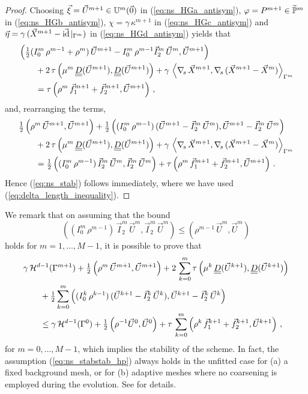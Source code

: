 \begin{proof}
Choosing $\vec\xi = \vec U^{m+1} \in \uspacedisc{0}{m}$ in
(\ref{eq:ns_HGa_antisym}), $\varphi = P^{m+1} \in \pnormspace^m$ in
(\ref{eq:ns_HGb_antisym}), $\chi = \gamma\,\kappa^{m+1}$ in
(\ref{eq:ns_HGc_antisym}) and
$\vec\eta=\gamma\,({\vec X^{m+1}-\vec\id\!\mid_{\Gamma^m}})$ in
(\ref{eq:ns_HGd_antisym}) yields that
\begin{align*}
& \left(\tfrac{1}{2}(I^m_0\,\rho^{m-1}+\rho^m)\,\vec U^{m+1} -
I^m_0\,\rho^{m-1} \vec I^m_2\,\vec U^m, \vec U^{m+1} \right) \\
& \qquad + 2\,\tau\left(\mu^m\,\mat D(\vec U^{m+1}), \mat D(\vec U^{m+1})\right)
+ \gamma\,\left\langle \nabs\,\vec X^{m+1}, \nabs\,(\vec X^{m+1} - \vec X^m)
\right\rangle_{\Gamma^m} \\
& \qquad = \tau\left(\rho^m\,\vec f_1^{m+1}+\vec f_2^{m+1}, \vec U^{m+1}
\right)\,,
\end{align*}
and, rearranging the terms,
\begin{align*}
& \tfrac{1}{2}\left(\rho^m\,\vec U^{m+1}, \vec U^{m+1} \right)+
\tfrac{1}{2}\left((I^m_0\,\rho^{m-1})\,(\vec U^{m+1}
-\vec I^m_2\,\vec U^m), \vec U^{m+1} - \vec I^m_2\,\vec U^m \right) \\
& \qquad + 2\,\tau\left(\mu^m\,\mat D(\vec U^{m+1}), \mat D(\vec U^{m+1})\right)
+ \gamma\,\left\langle \nabs\,\vec X^{m+1}, \nabs\,(\vec X^{m+1} - \vec X^m)
\right\rangle_{\Gamma^m} \\
& \qquad = \tfrac{1}{2}\left((I^m_0\,\rho^{m-1})\,\vec I^m_2\,\vec U^m,
\vec I^m_2\,\vec U^m \right)
+ \tau\left(\rho^m\,\vec f_1^{m+1}+\vec f_2^{m+1}, \vec U^{m+1} \right)\,.
\end{align*}
Hence (\ref{eq:ns_stab}) follows immediately, where we have used
(\ref{eq:delta_length_inequality}).
\end{proof}

We remark that on assuming that the bound
\begin{equation}\label{eq:ns_stabstab_hp}
\left((I^m_0\,\rho^{m-1})\,\vec I^m_2\,\vec U^m,
\vec I^m_2\,\vec U^m \right) \leq \left(\rho^{m-1}\,\vec U^m,\vec U^m \right)
\end{equation}
holds for $m=1,\ldots, M-1$, it is possible to prove that
\begin{align}\label{eq:ns_stabstab}
& \gamma\, \surfvol(\Gamma^{m+1})
+ \tfrac{1}{2}\left(\rho^m\,\vec U^{m+1}, \vec U^{m+1} \right)
+ 2\,\sum_{k=0}^{m}
\tau\left(\mu^k\,\mat D(\vec U^{k+1}), \mat D(\vec U^{k+1})\right)\nonumber \\
& \qquad + \tfrac{1}{2}\sum_{k=0}^{m}
\left((I^k_0\,\rho^{k-1})\,(\vec U^{k+1}
-\vec I^k_2\,\vec U^k), \vec U^{k+1} - \vec I^k_2\,\vec U^k \right) \nonumber \\
& \qquad \leq \gamma\, \surfvol(\Gamma^0)
+ \tfrac{1}{2}\left(\rho^{-1}\vec U^0, \vec U^0 \right)
+\tau\,\sum_{k=0}^{m}\left(\rho^k\,\vec f_1^{k+1}+\vec f_2^{k+1}, \vec U^{k+1}
\right)\,,
\end{align}
for $m=0,\ldots, M-1$, which implies the stability of the scheme.
In fact, the assumption (\ref{eq:ns_stabstab_hp}) always holds in the unfitted
case for (a) a fixed background mesh, or for (b) adaptive meshes where no
coarsening is employed during the evolution. See \cite{fluidfbp} for details.

